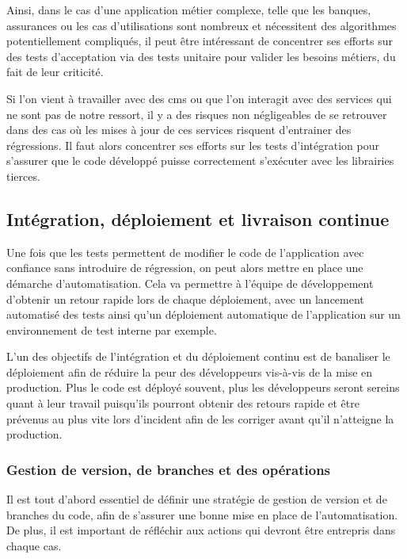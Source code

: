Ainsi, dans le cas d'une application métier complexe, telle que les banques, assurances ou les cas d'utilisations sont nombreux et nécessitent des algorithmes potentiellement compliqués, il peut être intéressant de concentrer ses efforts sur des tests d'acceptation via des tests unitaire pour valider les besoins métiers, du fait de leur criticité.

Si l'on vient à travailler avec des \gls{cms} ou que l'on interagit avec des services qui ne sont pas de notre ressort, il y a des risques non négligeables de se retrouver dans des cas où les mises à jour de ces services risquent d'entrainer des régressions. Il faut alors concentrer ses efforts sur les tests d'intégration pour s'assurer que le code développé puisse correctement s'exécuter avec les librairies tierces.

\subsection{Intégration, déploiement et livraison continue}

Une fois que les tests permettent de modifier le code de l'application avec confiance sans introduire de régression, on peut alors mettre en place une démarche d'automatisation. Cela va permettre à l'équipe de développement d'obtenir un retour rapide lors de chaque déploiement, avec un lancement automatisé des tests ainsi qu'un déploiement automatique de l'application sur un environnement de test interne par exemple.

L'un des objectifs de l'intégration et du déploiement continu est de banaliser le déploiement afin de réduire la peur des développeurs vis-à-vis de la mise en production. Plus le code est déployé souvent, plus les développeurs seront sereins quant à leur travail puisqu'ils pourront obtenir des retours rapide et être prévenus au plus vite lors d'incident afin de les corriger avant qu'il n'atteigne la production.

\subsubsection{Gestion de version, de branches et des opérations}

Il est tout d'abord essentiel de définir une stratégie de gestion de version et de branches du code, afin de s'assurer une bonne mise en place de l'automatisation. De plus, il est important de réfléchir aux actions qui devront être entrepris dans chaque cas. 


